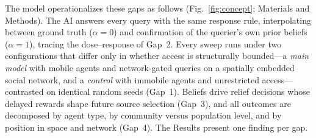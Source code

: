 \documentclass[pdflatex,sn-nature]{sn-jnl}
\begin{document}
The model operationalizes these gaps as follows (Fig.~\ref{fig:concept}; Materials and Methods). The AI answers every query with the same response rule, interpolating between ground truth ($\alpha=0$) and confirmation of the querier's own prior beliefs ($\alpha=1$), tracing the dose--response of Gap~2. Every sweep runs under two configurations that differ only in whether access is structurally bounded---a \emph{main model} with mobile agents and network-gated queries on a spatially embedded social network, and a \emph{control} with immobile agents and unrestricted access---contrasted on identical random seeds (Gap~1). Beliefs drive relief decisions whose delayed rewards shape future source selection (Gap~3), and all outcomes are decomposed by agent type, by community versus population level, and by position in space and network (Gap~4). The Results present one finding per gap.
\end{document}

